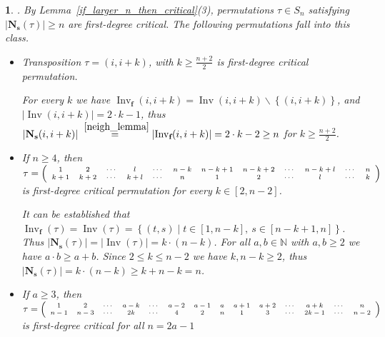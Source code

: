 \documentclass[a4 paper,12pt]{article}
\newcommand{\NN}{\mathbb{N}}
\DeclareMathOperator{\Inv}{Inv}
\newtheorem{numeris}{}[section]
\begin{document}
\begin{numeris}.  By Lemma~\ref{if_larger_n_then_critical}(3), permutations $\tau\in S_n$ satisfying 
$\left|\mathbf{N}_{\textbf{s}}(\tau)\right| \geq n$ 
are first-degree critical. The following permutations fall into this class. 



\begin{itemize}
	\item[1.]  Transposition  $\tau = (i,i+k)$, with $k\geq \frac{n +2}{2}$ is first-degree critical permutation.
	
  For every $k$ we have $\Inv_{\textbf{f}}(i,i+k) =  \Inv(i,i+k) \backslash \left\{(i,i+k)\right\}$, and $\left| \Inv(i,i+k)\right| = 2\cdot k -1$, thus 	$\left|\textbf{N}_{\textbf{s}}(i,i+k)\right| \stackrel{~\ref{neigh_lemma}}{=} \left|\Inv_{\textbf{f}}(i,i+k)\right| =  2\cdot k -2 \geq n $ for $k\geq \frac{n +2}{2}$. 
	
	
	
	
	
	\item[2.] If  $n\geq 4$, then  $\tau = \begin{scriptsize}\left(
\begin{array}{cccccccccccc}
	1& 2& \cdots & l & \cdots & n-k & n-k+1 & n-k+2 & \cdots & n-k+l & \cdots & n \\
	k+1 & k+2 & \cdots & k+l &  \cdots & n & 1 & 2 & \cdots &l & \cdots & k
\end{array}
\right)\end{scriptsize}$  is first-degree critical permutation  for every   $ k \in \left[2, n-2\right]$.


It can be established that $\Inv_{\textbf{f}}(\tau)= \Inv(\tau) = \left\{(t,s) \mid t\in \left[1,n-k\right], \  s\in \left[n-k+1,n\right] \right\}$. Thus 
 $\left|\textbf{N}_{\textbf{s}}(\tau)\right| = \left|\Inv(\tau)\right| =  k \cdot (n-k) $. For all $a,b\in \NN$ with $a,b\geq 2$ we have $a\cdot b \geq a+b$. Since $2\leq k\leq n-2$ we have $k,n-k\geq 2$, thus $\left|\textbf{N}_{\textbf{s}}(\tau)\right| = k\cdot (n-k) \geq k + n-k = n$. 
	
	
	
	
	 
	\item[3.]  If  $a\geq 3$, then 
	$\tau = \begin{scriptsize}\left(
\begin{array}{ccccccccccccccc}
	1 &2& \cdots & a-k & \cdots &a -2 &  a -1  & a & a+1 & a+2 & \cdots & a+ k & \cdots & n \\
	n-1 & n-3 & \cdots & 2 k & \cdots &4 &  2 & n & 1 & 3 & \cdots & 2 k-1 & \cdots & n-2
\end{array}
\right)\end{scriptsize}$ is first-degree critical  for all $n = 2a -1$
	

\end{itemize}
\end{numeris}
\end{document}
